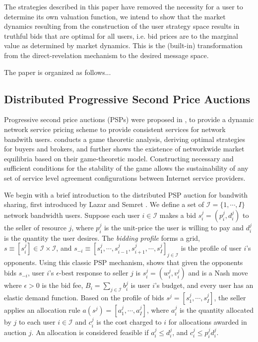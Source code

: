 \documentclass[sigconf, anonymous]{acmart}
\newcommand{\mcI}{\mathcal{I}}
\theoremstyle{definition}
\begin{document}
The strategies described in this paper have removed the
necessity for a user to determine its own valuation function, we intend to show that the market dynamics resulting from the
construction of the user strategy space results in truthful bids that are optimal for all users,
i.e. bid prices are to the marginal value as determined by market dynamics. 
This is the (built-in) transformation from the
direct-revelation mechanism to the desired message space.

The paper is organized as follows...

\subsection{Distributed Progressive Second Price Auctions}

Progressive second price auctions (PSPs) were proposed
in \cite{lazar}, \cite{diffserve} to provide a dynamic network service pricing
scheme to provide consistent services for network bandwith users.
\cite{diffserve} conducts a game theoretic analysis, deriving
optimal strategies for buyers and brokers, and further shows the existence
of networkwide market equilibria based on their game-theoretic
model. Constructing necessary and sufficient conditions for the stability
of the game allows the sustainability of any set
of service level agreement configurations between Internet service
providers.

We begin with a brief introduction to the distributed PSP auction for bandwith
sharing, first introduced by Lazar and Semret \cite{lazar}.
We define a set of $\mcI = \lbrace 1,\cdots,I\rbrace$ network bandwidth users.
Suppose each user $i \in \mcI$ makes a bid $s_i^j = (p_i^j, d_i^j)$ to the
seller of resource $j$, where $p_i^j$ is the unit-price the user is willing to
pay and $d_i^j$ is the quantity the user desires. The \emph{bidding profile} forms a grid, $s \equiv
[s_i^j] \in \mcI \times \mcI$, and $s_{-i} \equiv [s_1^j , \cdots , s_{i-1}^j , s_{i+1}^j , \cdots
, s_I^j]_{j\in\mcI}$ is the profile of user $i$'s opponents. 
Using this classic PSP mechanism, \cite{lazar} shows that given the opponents
bids $s_{-i}$,
user $i$'s $\epsilon$-best response to seller $j$ is $s_i^j = (w_i^j, v_i^j)$
and is a Nash move
where $\epsilon > 0$ is the bid fee, $B_i =\sum_{j\in\mcI} b_i^j$ is user $i$'s
budget, and every user has an elastic demand function.
Based on the profile of bids $s^j = [s^j_1, \cdots , s^j_I]$, the seller applies
an allocation rule $a(s^j) = [a_1^j, \cdots , a_I^j]$, where $a^j_i$ is the quantity allocated
by $j$ to each user $i\in\mcI$ and $c^j_i$ is the cost charged to $i$ for
allocations awarded in auction $j$. 
An allocation is considered feasible if $a^j_i \le d_i^j$, and $c^j_i \le  p^j_i d_i^j$.
\end{document}
